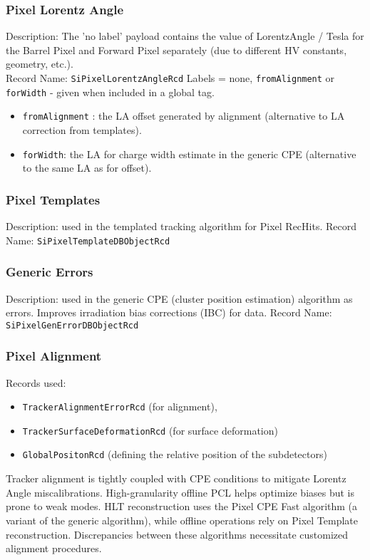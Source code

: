 \subsubsection{Pixel Lorentz Angle}
Description: The 'no label' payload contains the value of LorentzAngle / Tesla for the Barrel Pixel and Forward Pixel separately (due to different HV constants, geometry, etc.).\\
Record Name: \texttt{SiPixelLorentzAngleRcd} 
Labels = none, \texttt{fromAlignment} or \texttt{forWidth} - given when included in a global tag.
\begin{itemize}
\item \texttt{fromAlignment} : the LA offset generated by alignment (alternative to LA correction from templates).
\item \texttt{forWidth}: the LA for charge width estimate in the generic CPE (alternative to the same LA as for offset). 
\end{itemize}

\subsubsection{Pixel Templates}
Description: used in the templated tracking algorithm for Pixel RecHits.
Record Name:  \texttt{SiPixelTemplateDBObjectRcd} 

\subsubsection{Generic Errors}

Description: used in the generic CPE (cluster position estimation) algorithm as errors. Improves irradiation bias corrections (IBC) for data.
Record Name:  \texttt{SiPixelGenErrorDBObjectRcd}

\subsubsection{Pixel Alignment}
Records used: 
\begin{itemize}
\item \texttt{TrackerAlignmentErrorRcd} (for alignment), 
\item \texttt{TrackerSurfaceDeformationRcd} (for surface deformation)  \item \texttt{GlobalPositonRcd} (defining the relative position of the subdetectors) 
\end{itemize}

Tracker alignment is tightly coupled with CPE conditions to mitigate Lorentz Angle miscalibrations. High-granularity offline PCL helps optimize biases but is prone to weak modes.
HLT reconstruction uses the Pixel CPE Fast algorithm (a variant of the generic algorithm), while offline operations rely on Pixel Template reconstruction. Discrepancies between these algorithms necessitate customized alignment procedures.

